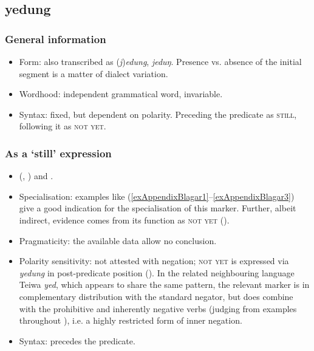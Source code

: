 \subsection{yedung}
\subsubsection{General information}
\begin{itemize}
	\item Form: also transcribed as (\textit{j})\textit{edung}, \textit{jeduŋ}. Presence vs. absence of the initial segment is a matter of dialect variation.
	\item Wordhood: independent grammatical word, invariable.
	\item Syntax: fixed, but dependent on polarity. Preceding the predicate as \textsc{still}, following it as \textsc{not yet}. 
\end{itemize}

\subsubsection{As a \lq{}still\rq{ }expression}
\begin{itemize}
	\sloppy
	\item \citeauthor{Steinhauer1995} (\citeyear[281]{Steinhauer1995}, \citeyear[153]{SteinhauerBukalabang}) and \textcite[195, 295]{SteinhauerGomang2016}.
	\item Specialisation: examples like (\ref{exAppendixBlagar1}–\ref{exAppendixBlagar3}) give a good indication for the specialisation of this marker. Further, albeit indirect, evidence comes from its function as \textsc{not yet} ().
	\item Pragmaticity: the available data allow no conclusion.
	\item Polarity sensitivity: not attested with negation; \textsc{not yet} is expressed via \textit{yedung} in post-predicate position (). In the related neighbouring language Teiwa \textit{yed}, which appears to share the same pattern, the relevant marker is in complementary distribution with the standard negator, but does combine with the prohibitive and inherently negative verbs (judging from examples throughout \cite{Klamer2010}), i.e. a highly restricted form of inner negation.
	\item Syntax: precedes the predicate.
\end{itemize}

